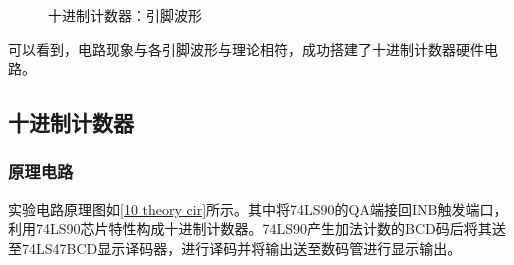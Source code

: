 \documentclass[UTF8]{ctexart}
\numberwithin{figure}{subsection}
\numberwithin{table}{subsection}
\numberwithin{equation}{subsection}
\begin{document}
\begin{figure}[H]
    \centering
    \caption{十进制计数器：引脚波形}
    \label{10 osci}
\end{figure}

\par 可以看到，电路现象与各引脚波形与理论相符，成功搭建了十进制计数器硬件电路。


\subsection{十进制计数器}
\subsubsection{原理电路}
\par 实验电路原理图如\ref{10 theory cir}所示。其中将74LS90的QA端接回INB触发端口，利用74LS90芯片特性构成十进制计数器。74LS90产生加法计数的BCD码后将其送至74LS47BCD显示译码器，进行译码并将输出送至数码管进行显示输出。
\end{document}
